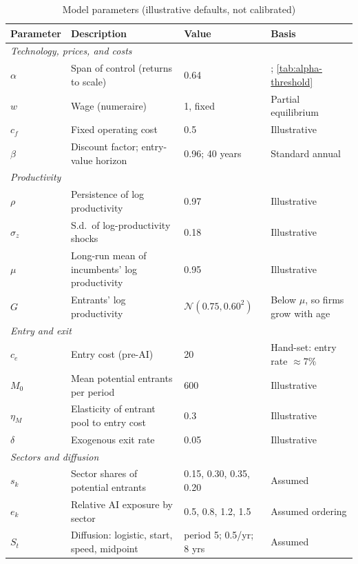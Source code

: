 \begin{table}[t]
  \centering
  \caption{Model parameters (illustrative defaults, not calibrated)}
  \label{tab:calibration}
  \footnotesize
  \setlength{\tabcolsep}{4pt}
  \begin{tabular}{lp{5.2cm}p{3.0cm}p{4.6cm}}
    \toprule
    Parameter & Description & Value & Basis \\
    \midrule
    \multicolumn{4}{l}{\textit{Technology, prices, and costs}} \\
    $\alpha$ & Span of control (returns to scale) & 0.64 & \citet{hopenhayn1993job}; \cref{tab:alpha-threshold} \\
    $w$ & Wage (numeraire) & 1, fixed & Partial equilibrium \\
    $c_f$ & Fixed operating cost & 0.5 & Illustrative \\
    $\beta$ & Discount factor; entry-value horizon & 0.96; 40 years & Standard annual \\
    \multicolumn{4}{l}{\textit{Productivity}} \\
    $\rho$ & Persistence of log productivity & 0.97 & Illustrative \\
    $\sigma_z$ & S.d.\ of log-productivity shocks & 0.18 & Illustrative \\
    $\mu$ & Long-run mean of incumbents' log productivity & 0.95 & Illustrative \\
    $G$ & Entrants' log productivity & $\mathcal{N}(0.75, 0.60^2)$ & Below $\mu$, so firms grow with age \\
    \multicolumn{4}{l}{\textit{Entry and exit}} \\
    $c_e$ & Entry cost (pre-AI) & 20 & Hand-set: entry rate $\approx 7\%$ \\
    $M_0$ & Mean potential entrants per period & 600 & Illustrative \\
    $\eta_M$ & Elasticity of entrant pool to entry cost & 0.3 & Illustrative \\
    $\delta$ & Exogenous exit rate & 0.05 & Illustrative \\
    \multicolumn{4}{l}{\textit{Sectors and diffusion}} \\
    $s_k$ & Sector shares of potential entrants & 0.15, 0.30, 0.35, 0.20 & Assumed \\
    $e_k$ & Relative AI exposure by sector & 0.5, 0.8, 1.2, 1.5 & Assumed ordering \\
    $S_t$ & Diffusion: logistic, start, speed, midpoint & period 5; 0.5/yr; 8 yrs & Assumed \\

\end{tabular}
\end{table}
